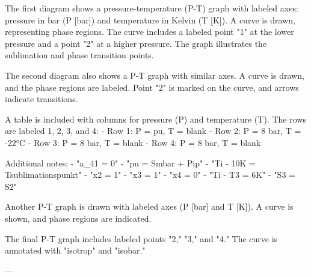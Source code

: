 The first diagram shows a pressure-temperature (P-T) graph with labeled axes: pressure in bar (P [bar]) and temperature in Kelvin (T [K]). A curve is drawn, representing phase regions. The curve includes a labeled point "1" at the lower pressure and a point "2" at a higher pressure. The graph illustrates the sublimation and phase transition points.  

The second diagram also shows a P-T graph with similar axes. A curve is drawn, and the phase regions are labeled. Point "2" is marked on the curve, and arrows indicate transitions.  

A table is included with columns for pressure (P) and temperature (T). The rows are labeled 1, 2, 3, and 4:  
- Row 1: P = pu, T = blank  
- Row 2: P = 8 bar, T = -22°C  
- Row 3: P = 8 bar, T = blank  
- Row 4: P = 8 bar, T = blank  

Additional notes:  
- "a_41 = 0"  
- "pu = Smbar + Pip"  
- "Ti - 10K = Tsublimationspunkt"  
- "x2 = 1"  
- "x3 = 1"  
- "x4 = 0"  
- "Ti - T3 = 6K"  
- "S3 = S2"  

Another P-T graph is drawn with labeled axes (P [bar] and T [K]). A curve is shown, and phase regions are indicated.  

The final P-T graph includes labeled points "2," "3," and "4." The curve is annotated with "isotrop" and "isobar."  

---